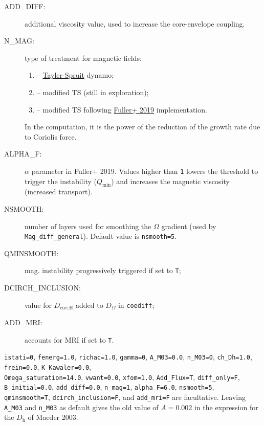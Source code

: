 \documentclass[11pt]{article}
\def\ddh{\ensuremath{D_\text{h}}}
\begin{document}
\begin{description}
\begin{description}
      \item[ADD\_DIFF:] additional viscosity value, used to increase the core-envelope coupling.
      \item[N\_MAG:] type of treatment for magnetic fields:
      \begin{enumerate}[labelindent=.5cm,font=\ttfamily \bfseries,label=\arabic*]
        \item[1] -- \href{https://ui.adsabs.harvard.edu/abs/2002A&A...381..923S}{Tayler-Spruit} dynamo;
        \item[2] -- modified TS (still in exploration);
        \item[3] -- modified TS following \href{https://ui.adsabs.harvard.edu/abs/2019MNRAS.485.3661F}{Fuller+ 2019} implementation.
      \end{enumerate}
      In the computation, it is the power of the reduction of the growth rate due to Coriolis force.
      \item[ALPHA\_F:] $\alpha$ parameter in Fuller+ 2019. Values higher than \texttt{1} lowers the threshold to trigger the instability ($Q_\text{min}$) and increases the magnetic viscosity (increased transport).
      \item[NSMOOTH:] number of layers used for smoothing the $\Omega$ gradient (used by \texttt{Mag\_diff\_general}). Default value is \texttt{nsmooth=5}.
      \item[QMINSMOOTH:] mag. instability progressively triggered if set to \texttt{T};
      \item[DCIRCH\_INCLUSION:] value for $D_\text{circ,H}$ added to $D_\Omega$ in \texttt{coediff};
      \item[ADD\_MRI:] accounts for MRI if set to \texttt{T}.
    \end{description}
    \texttt{istati=0}, \texttt{fenerg=1.0}, \texttt{richac=1.0}, \texttt{gamma=0}, \texttt{A\_M03=0.0}, \texttt{n\_M03=0}, \texttt{ch\_Dh=1.0}, \texttt{frein=0.0}, \texttt{K\_Kawaler=0.0},\\ \texttt{Omega\_saturation=14.0}, \texttt{vwant=0.0}, \texttt{xfom=1.0}, \texttt{Add\_Flux=T}, \texttt{diff\_only=F}, \texttt{B\_initial=0.0}, \texttt{add\_diff=0.0}, \texttt{n\_mag=1}, \texttt{alpha\_F=6.0}, \texttt{nsmooth=5}, \texttt{qminsmooth=T}, \texttt{dcirch\_inclusion=F}, and \texttt{add\_mri=F} are facultative. Leaving \texttt{A\_M03} and \texttt{n\_M03} as default gives the old value of $A=0.002$ in the expression for the {\ddh} of Maeder 2003.


\end{description}
\end{document}

